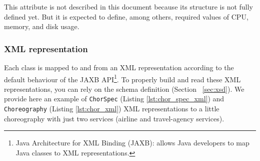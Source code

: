 This attribute is not described in this document because its structure is not fully defined yet. But it is expected to define, among others, required values of CPU, memory, and disk usage.

\subsubsection*{XML representation}

Each class is mapped to and from an XML representation according to the default behaviour of the JAXB API\footnote{Java Architecture for XML Binding (JAXB): allows Java developers to map Java classes to XML representations.}. 
To properly build and read these XML representations, you can rely on the schema definition (Section~ \ref{sec:xsd}). We provide here an example of \verb!ChorSpec! (Listing \ref{lst:chor_spec_xml}) and \verb!Choreography! (Listing \ref{lst:chor_xml}) XML representations to a little choreography with just two services (airline and travel-agency services). 

